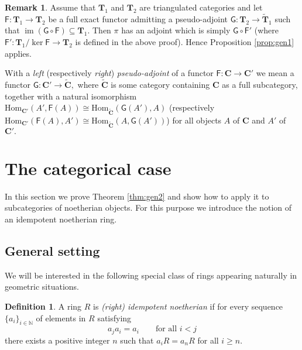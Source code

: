 \documentclass[a4paper,11pt,twoside]{amsart}
\numberwithin{equation}{section}
\theoremstyle{definition}
\newtheorem{definition}[thm]{Definition}
\newtheorem{remark}[thm]{Remark}
\begin{document}
\begin{remark}\label{rmk:pseudoadj}
Assume that ${{\mathbf{{T}}}}_1$ and ${{\mathbf{{T}}}}_2$ are triangulated categories and let ${\mathsf{{F}}}:{{\mathbf{{T}}}}_1\to{{\mathbf{{T}}}}_2$ be a full exact functor admitting a pseudo-adjoint ${\mathsf{{G}}}\colon{{\mathbf{{T}}}}_2\to\tilde{{{\mathbf{{T}}}}}_1$ such that $\operatorname{im}({\mathsf{{G}}}{\circ}{\mathsf{{F}}})\subseteq{{\mathbf{{T}}}}_1.$ Then $\pi$ has an adjoint which is simply ${\mathsf{{G}}}{\circ}{\mathsf{{F}}}'$ (where ${\mathsf{{F}}}'\colon{{\mathbf{{T}}}}_1/\ker{\mathsf{{F}}}\to{{\mathbf{{T}}}}_2$ is defined in the above proof). Hence Proposition \ref{prop:gen1} applies.

With a  \emph{left} (respectively \emph{right}) {\em pseudo-adjoint} of a functor
${\mathsf{{F}}}\colon{{\mathbf{{C}}}}\to{{\mathbf{{C}}}}'$ we mean a functor
${\mathsf{{G}}}\colon{{\mathbf{{C}}}}'\to\tilde{{{\mathbf{{C}}}}},$ where $\tilde{{{\mathbf{{C}}}}}$ is
some category containing ${{\mathbf{{C}}}}$ as a full subcategory, together
with a natural isomorphism
${\mathrm{Hom}}_{{{\mathbf{{C}}}}'}(A',{\mathsf{{F}}}(A)){\cong}{\mathrm{Hom}}_{\tilde{{{\mathbf{{C}}}}}}({\mathsf{{G}}}(A'),A)$
(respectively
${\mathrm{Hom}}_{{{\mathbf{{C}}}}'}({\mathsf{{F}}}(A),A'){\cong}{\mathrm{Hom}}_{\tilde{{{\mathbf{{C}}}}}}(A,{\mathsf{{G}}}(A'))$)
for all objects $A$ of ${{\mathbf{{C}}}}$ and $A'$ of ${{\mathbf{{C}}}}'.$
\end{remark}

\section{The categorical case}\label{sec:proof}

In this section we prove Theorem \ref{thm:gen2} and show how to apply it to subcategories of  noetherian objects.
For this purpose we introduce the notion of an idempotent noetherian ring.

\subsection{General setting}\label{subsec:categprelim}

We will be interested in the following special class of rings
appearing naturally in geometric situations.

\begin{definition}\label{def:idempnoeth}
A ring $R$ is \emph{(right) idempotent noetherian} if for every sequence
$\{a_i\}_{i\in{\mathbb{N}}}$ of elements in $R$ satisfying
\begin{equation}\label{eqn:strangeseq}
a_ja_i=a_i\qquad\text{for all $i<j$}
\end{equation}
there exists a positive integer $n$ such that $a_iR=a_nR$ for all $i\geq n.$
\end{definition}
\end{document}
